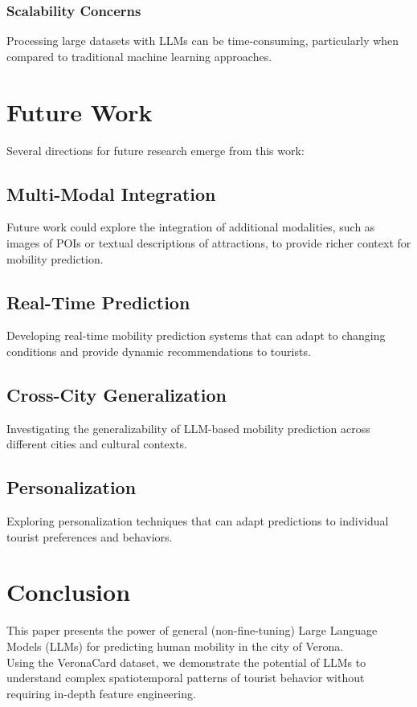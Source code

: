 \documentclass[12pt,a4paper]{article}
\begin{document}
\subsubsection{Scalability Concerns}
Processing large datasets with LLMs can be time-consuming, particularly when compared to traditional machine learning approaches.

\section{Future Work}

Several directions for future research emerge from this work:

\subsection{Multi-Modal Integration}
Future work could explore the integration of additional modalities, such as images of POIs or textual descriptions of attractions, to provide richer context for mobility prediction.

\subsection{Real-Time Prediction}
Developing real-time mobility prediction systems that can adapt to changing conditions and provide dynamic recommendations to tourists.

\subsection{Cross-City Generalization}
Investigating the generalizability of LLM-based mobility prediction across different cities and cultural contexts.

\subsection{Personalization}
Exploring personalization techniques that can adapt predictions to individual tourist preferences and behaviors.

\section{Conclusion}

This paper presents the power of general (non-fine-tuning) Large Language Models (LLMs) for predicting human mobility in the city of Verona.\\
Using the VeronaCard dataset, we demonstrate the potential of LLMs to understand complex spatiotemporal patterns of tourist behavior without requiring in-depth feature engineering.\\
\end{document}

